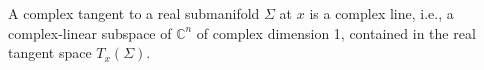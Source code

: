 
A complex tangent to a real submanifold $\Sigma$ at $x$ is a complex line, i.e., a complex-linear subspace of $\mathbb{C}^n$ of complex dimension 1, contained in the real tangent space $T_x(\Sigma)$.
